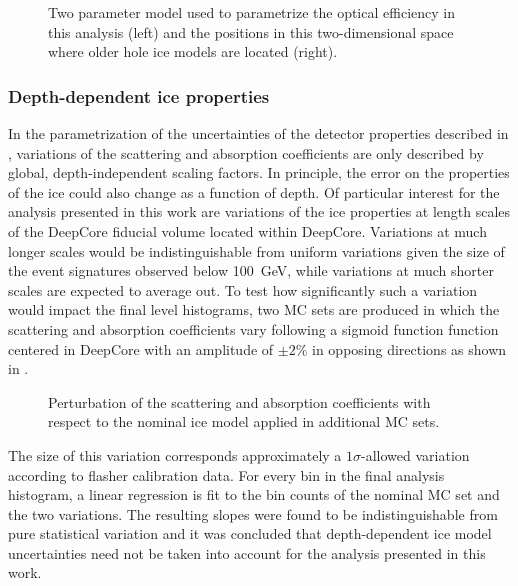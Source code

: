 \begin{figure}
    \centering
    
    
    \caption{Two parameter model used to parametrize the optical efficiency in this analysis (left) and the positions in this two-dimensional space where older hole ice models are located (right).}
    \label{fig:hole-ice-parametrization}
\end{figure}

\subsubsection{Depth-dependent ice properties}
\label{sec:depth-dependent-ice-properties}

In the parametrization of the uncertainties of the detector properties described in , variations of the scattering and absorption coefficients are only described by global, depth-independent scaling factors. In principle, the error on the properties of the ice could also change as a function of depth. Of particular interest for the analysis presented in this work are variations of the ice properties at length scales of the DeepCore fiducial volume located within DeepCore. Variations at much longer scales would be indistinguishable from uniform variations given the size of the event signatures observed below 100~GeV, while variations at much shorter scales are expected to average out. To test how significantly such a variation would impact the final level histograms, two MC sets are produced in which the scattering and absorption coefficients vary following a sigmoid function function centered in DeepCore with an amplitude of $\pm 2\%$ in opposing directions as shown in .
\begin{figure}
    \centering
    
    \caption{Perturbation of the scattering and absorption coefficients with respect to the nominal ice model applied in additional MC sets.}
    \label{fig:step-function-ice-model}
\end{figure}
The size of this variation corresponds approximately a $1\sigma$-allowed variation according to flasher calibration data. For every bin in the final analysis histogram, a linear regression is fit to the bin counts of the nominal MC set and the two variations. The resulting slopes were found to be indistinguishable from pure statistical variation and it was concluded that depth-dependent ice model uncertainties need not be taken into account for the analysis presented in this work.

